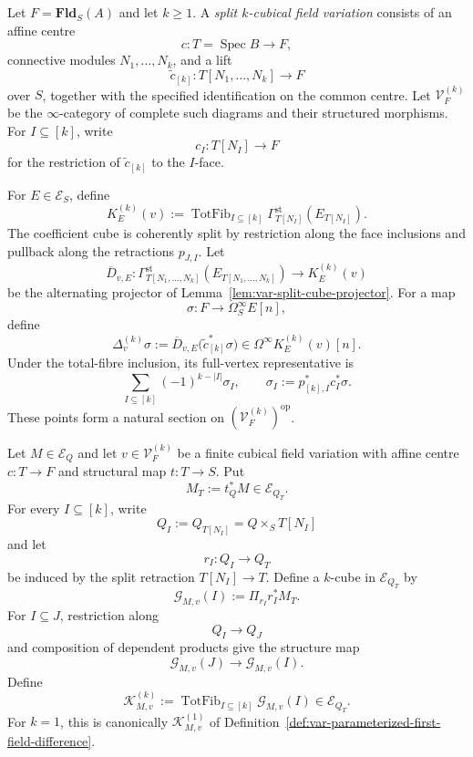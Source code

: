 \begin{definition}
\label{def:var-field-k-variation}
Let \(F=\mathbf{Fld}_S(A)\) and let \(k\ge1\). A \emph{split \(k\)-cubical field variation} consists of an affine centre
\[
    c:T=\operatorname{Spec}B\longrightarrow F,
\]
connective modules \(N_1,\ldots,N_k\), and a lift
\[
    \widetilde c_{[k]}:
    T[N_1,\ldots,N_k]
    \longrightarrow
    F
\]
over \(S\), together with the specified identification on the common centre. Let \(\mathcal V_F^{(k)}\) be the \(\infty\)-category of complete such diagrams and their structured morphisms. For \(I\subseteq[k]\), write
\[
    c_I:T[N_I]\longrightarrow F
\]
for the restriction of \(\widetilde c_{[k]}\) to the \(I\)-face.

For \(E\in\mathcal E_S\), define
\[
    K_E^{(k)}(v)
    :=
    \operatorname{TotFib}_{I\subseteq[k]}
    \Gamma_{T[N_I]}^{\mathrm{st}}(E_{T[N_I]}).
\]
The coefficient cube is coherently split by restriction along the face inclusions and pullback along the retractions \(p_{J,I}\). Let
\[
    \overline D_{v,E}:
    \Gamma_{T[N_1,\ldots,N_k]}^{\mathrm{st}}(E_{T[N_1,\ldots,N_k]})
    \longrightarrow
    K_E^{(k)}(v)
\]
be the alternating projector of Lemma~\ref{lem:var-split-cube-projector}. For a map
\[
    \sigma:F\longrightarrow\Omega_S^\infty E[n],
\]
define
\[
    \boxed{
    \Delta_v^{(k)}\sigma
    :=
    \overline D_{v,E}\bigl(\widetilde c_{[k]}^*\sigma\bigr)
    \in
    \Omega^\infty K_E^{(k)}(v)[n].
    }
\]
Under the total-fibre inclusion, its full-vertex representative is
\[
    \sum_{I\subseteq[k]}
    (-1)^{k-|I|}\sigma_I,
    \qquad
    \sigma_I:=p_{[k],I}^*c_I^*\sigma.
\]
These points form a natural section on \((\mathcal V_F^{(k)})^{\mathrm{op}}\).
\end{definition}

\begin{definition}
\label{def:var-parameterized-k-field-difference}
Let \(M\in\mathcal E_Q\) and let \(v\in\mathcal V_F^{(k)}\) be a finite cubical field variation with affine centre \(c:T\to F\) and structural map \(t:T\to S\). Put
\[
    M_T:=t_Q^*M\in\mathcal E_{Q_T}.
\]
For every \(I\subseteq[k]\), write
\[
    Q_I:=Q_{T[N_I]}=Q\times_ST[N_I]
\]
and let
\[
    r_I:Q_I\longrightarrow Q_T
\]
be induced by the split retraction \(T[N_I]\to T\). Define a \(k\)-cube in \(\mathcal E_{Q_T}\) by
\[
    \mathscr G_{M,v}(I)
    :=
    \Pi_{r_I}r_I^*M_T.
\]
For \(I\subseteq J\), restriction along
\[
    Q_I\longrightarrow Q_J
\]
and composition of dependent products give the structure map
\[
    \mathscr G_{M,v}(J)
    \longrightarrow
    \mathscr G_{M,v}(I).
\]
Define
\[
    \boxed{
    \mathscr K^{(k)}_{M,v}
    :=
    \operatorname{TotFib}_{I\subseteq[k]}
    \mathscr G_{M,v}(I)
    \in
    \mathcal E_{Q_T}.
    }
\]
For \(k=1\), this is canonically \(\mathscr K^{(1)}_{M,v}\) of Definition~\ref{def:var-parameterized-first-field-difference}.
\end{definition}

